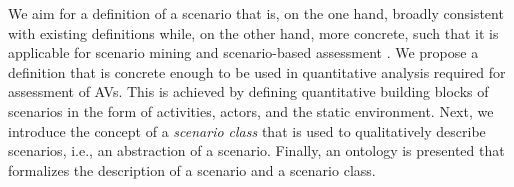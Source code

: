 We aim for a definition of a scenario that is, on the one hand, broadly consistent with existing definitions \cite{geyer2014, ulbrich2015, elrofai2016scenario} while, on the other hand, more concrete, such that it is applicable for scenario mining \cite{elrofai2016scenario} and scenario-based assessment \cite{stellet2015taxonomy, deGelder2017assessment}. We propose a definition that is concrete enough to be used in quantitative analysis required for assessment of AVs. This is achieved by defining quantitative building blocks of scenarios in the form of \cbstart activities, actors, and the static environment. Next, we introduce the concept of a \emph{scenario class} that is used to qualitatively describe scenarios, i.e., an abstraction of a scenario. Finally, an ontology is presented that formalizes the description of a scenario and a scenario class. 
\cbend

